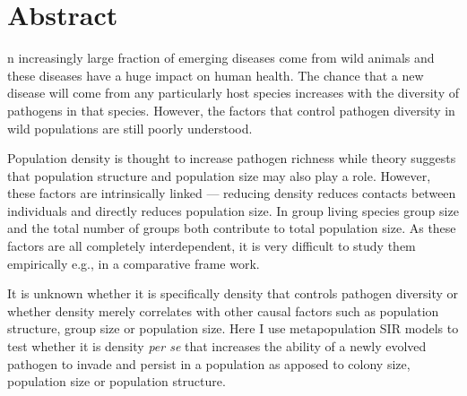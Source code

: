 










\section{Abstract}

n increasingly large fraction of emerging diseases come from wild animals and these diseases have a huge impact on human health.
The chance that a new disease will come from any particularly host species increases with the diversity of pathogens in that species.
However, the factors that control pathogen diversity in wild populations are still poorly understood.



Population density is thought to increase pathogen richness while theory suggests that population structure and population size may also play a role.
However, these factors are intrinsically linked --- reducing density reduces contacts between individuals and directly reduces population size.
In group living species group size and the total number of groups both contribute to total population size. 
As these factors are all completely interdependent, it is very difficult to study them empirically e.g., in a comparative frame work.



It is unknown whether it is specifically density that controls pathogen diversity or whether density merely correlates with other causal factors such as population structure, group size or population size.
Here I use metapopulation SIR models to test whether it is density \emph{per se} that increases the ability of a newly evolved pathogen to invade and persist in a population as apposed to colony size, population size or population structure.


